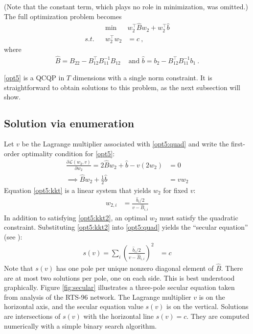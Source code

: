 \documentclass[conference]{IEEEtran}
\begin{document}
(Note that the constant term, which plays no role in minimization, was omitted.) The full optimization problem becomes
\begin{subequations}\label{opt5}
\begin{align}
&& \min~& w_2^\top \hat{B}w_2 + w_2^\top \hat{b} \\
\label{opt5:quad} s.t. && w_2^\top w_2 &= c~,
\end{align}
\end{subequations}
where
\begin{align*}
\hat{B} = B_{22} - B_{12}^\top B_{11}^{-1}B_{12} &\text{ and }\hat{b} = b_2 - B_{12}^\top B_{11}^{-1}b_1~.
\end{align*}

\eqref{opt5} is a QCQP in $T$ dimensions with a single norm constraint. It is straightforward to obtain solutions to this problem, as the next subsection will show.

\subsection{Solution via enumeration}

Let $v$ be the Lagrange multiplier associated with \eqref{opt5:quad} and write the first-order optimality condition for \eqref{opt5}:
\begin{align}
\nonumber \frac{\partial \mathcal{L}(w_2,v)}{\partial w_2} = 2\hat{B}w_2 + \hat{b} - v(2w_2) &= 0 \\
\label{opt5:kkt} \implies \hat{B}w_2 + \frac{1}{2}\hat{b} &= vw_2
\end{align}
Equation \eqref{opt5:kkt} is a linear system that yields $w_2$ for fixed $v$:
\begin{align}
\label{opt5:kkt2}w_{2,i} &= \frac{\hat{b}_i/2}{v - \hat{B}_{i,i}}
\end{align}
In addition to satisfying \eqref{opt5:kkt2}, an optimal $w_2$ must satisfy the quadratic constraint. Substituting \eqref{opt5:kkt2} into \eqref{opt5:quad} yields the ``secular equation'' (see \cite{bienstock2014}):
\begin{align}
s(v) = \sum_{i}\left( \frac{\hat{b}_i /2}{v - \hat{B}_{i,i}}\right)^2 &= c
\end{align}
Note that $s(v)$ has one pole per unique nonzero diagonal element of $\hat{B}$. There are at most two solutions per pole, one on each side. This is best understood graphically. Figure \ref{fig:secular} illustrates a three-pole secular equation taken from analysis of the RTS-96 network. The Lagrange multiplier $v$ is on the horizontal axis, and the secular equation value $s(v)$ is on the vertical. Solutions are intersections of $s(v)$ with the horizontal line $s(v)=c$. They are computed numerically with a simple binary search algorithm.
\end{document}
